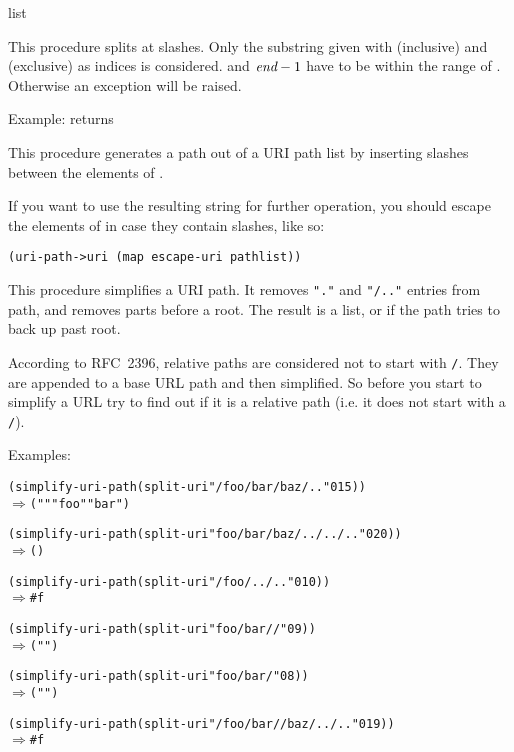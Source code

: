  {list}
\begin{desc}
  This procedure splits  at slashes. Only the substring given
  with  (inclusive) and  (exclusive) as indices is
  considered.   and $\var{end} - 1$ have to be within the
  range of .  Otherwise an  exception
  will be raised.
  
  Example:  returns
\end{desc}

\begin{desc}
  This procedure generates a path out of a URI path list by inserting
  slashes between the elements of .
\end{desc}
%
If you want to use the resulting string for further operation, you
should escape the elements of  in case they contain
slashes, like so:
%
\begin{verbatim}
(uri-path->uri (map escape-uri pathlist))
\end{verbatim}

\begin{desc}
  This procedure simplifies a URI path.  It removes \verb|"."| and
  \verb|"/.."| entries from path, and removes parts before a root.
  The result is a list, or \sharpf{} if the path tries to back up past
  root.
\end{desc}
%
According to RFC~2396, relative paths are considered not to start with
\verb|/|.  They are appended to a base URL path and then simplified.
So before you start to simplify a URL try to find out if it is a
relative path (i.e. it does not start with a \verb|/|).

Examples:
%
\begin{alltt}
(simplify-uri-path (split-uri  "/foo/bar/baz/.."  0 15))
\(\Rightarrow\) ("" "foo" "bar")

(simplify-uri-path (split-uri "foo/bar/baz/../../.." 0 20))
\(\Rightarrow\) ()

(simplify-uri-path (split-uri "/foo/../.." 0 10))
\(\Rightarrow\) #f

(simplify-uri-path (split-uri "foo/bar//" 0 9))
\(\Rightarrow\) ("")     

(simplify-uri-path (split-uri "foo/bar/" 0 8))
\(\Rightarrow\) ("")

(simplify-uri-path (split-uri "/foo/bar//baz/../.." 0 19))
\(\Rightarrow\) #f
\end{alltt}


